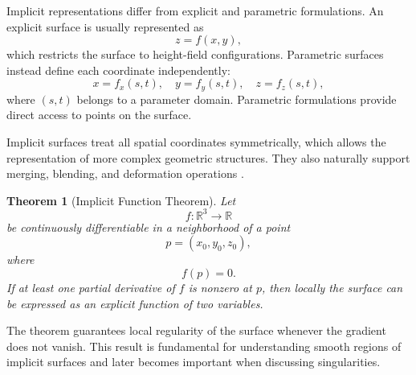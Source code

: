 \documentclass[12pt, a4paper, oneside]{book}
\theoremstyle{plain}
\newtheorem{theorem}{Theorem}[chapter]
\theoremstyle{definition}
\theoremstyle{remark}
\theoremstyle{definition}
\begin{document}
\begin{center}
\end{center}

Implicit representations differ from explicit and parametric formulations. An explicit surface is usually represented as
\[
z=f(x,y),
\]
which restricts the surface to height-field configurations. Parametric surfaces instead define each coordinate independently:
\[
x=f_x(s,t), \quad y=f_y(s,t), \quad z=f_z(s,t),
\]
where $(s,t)$ belongs to a parameter domain. Parametric formulations provide direct access to points on the surface.

Implicit surfaces treat all spatial coordinates symmetrically, which allows the representation of more complex geometric structures. They also naturally support merging, blending, and deformation operations \cite{bloomenthal2000implicit}.

\begin{theorem}[Implicit Function Theorem]
Let
\[
f : \mathbb{R}^3 \to \mathbb{R}
\]
be continuously differentiable in a neighborhood of a point
\[
p=(x_0,y_0,z_0),
\]
where
\[
f(p)=0.
\]
If at least one partial derivative of $f$ is nonzero at $p$, then locally the surface can be expressed as an explicit function of two variables.
\end{theorem}

The theorem guarantees local regularity of the surface whenever the gradient does not vanish. This result is fundamental for understanding smooth regions of implicit surfaces and later becomes important when discussing singularities.
\end{document}
